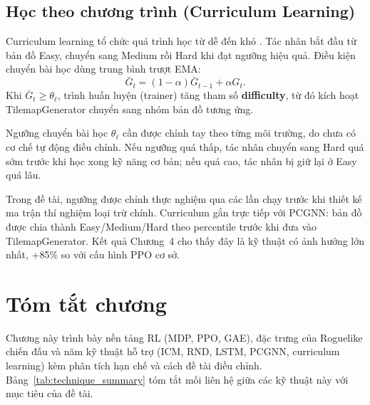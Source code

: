 \subsection{Học theo chương trình (Curriculum Learning)}

Curriculum learning tổ chức quá trình học từ dễ đến khó \cite{Bengio2009}. Tác nhân bắt đầu từ bản đồ Easy, chuyển sang Medium rồi Hard khi đạt ngưỡng hiệu quả. Điều kiện chuyển bài học dùng trung bình trượt EMA:
\begin{equation}
    \bar{G}_t = (1-\alpha)\bar{G}_{t-1} + \alpha G_t.
    \label{eq:curriculum_ema}
\end{equation}
Khi $\bar{G}_t \geq \theta_\ell$, trình huấn luyện (trainer) tăng tham số \textbf{difficulty}, từ đó kích hoạt TilemapGenerator chuyển sang nhóm bản đồ tương ứng.

Ngưỡng chuyển bài học $\theta_\ell$ cần được chỉnh tay theo từng môi trường, do chưa có cơ chế tự động điều chỉnh. Nếu ngưỡng quá thấp, tác nhân chuyển sang Hard quá sớm trước khi học xong kỹ năng cơ bản; nếu quá cao, tác nhân bị giữ lại ở Easy quá lâu.

Trong đề tài, ngưỡng được chỉnh thực nghiệm qua các lần chạy trước khi thiết kế ma trận thí nghiệm loại trừ chính. Curriculum gắn trực tiếp với PCGNN: bản đồ được chia thành Easy/Medium/Hard theo percentile trước khi đưa vào TilemapGenerator. Kết quả Chương~4 cho thấy đây là kỹ thuật có ảnh hưởng lớn nhất, +85\% so với cấu hình PPO cơ sở.

\section{Tóm tắt chương}

Chương này trình bày nền tảng RL (MDP, PPO, GAE), đặc trưng của Roguelike chiến đấu và năm kỹ thuật hỗ trợ (ICM, RND, LSTM, PCGNN, curriculum learning) kèm phân tích hạn chế và cách đề tài điều chỉnh. Bảng~\ref{tab:technique_summary} tóm tắt mối liên hệ giữa các kỹ thuật này với mục tiêu của đề tài.

